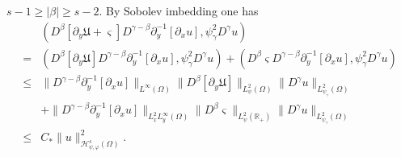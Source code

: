 \documentclass{amsart}
\numberwithin{equation}{section}
\begin{document}
 $s-1\geq|\beta|\geq s-2$.
By Sobolev imbedding one has
\begin{align*}
&(D^{\beta}[\partial_{y}\mathfrak{U}+\varsigma]D^{\gamma-\beta}\partial_{y}^{-1}[\partial_{x}u],\psi_{\gamma}^{2}D^{\gamma}u)\\
=& (D^{\beta}[\partial_{y}\mathfrak{U}]D^{\gamma-\beta}\partial_{y}^{-1}[\partial_{x}u],\psi_{\gamma}^{2}D^{\gamma}u)
  +(D^{\beta}\varsigma D^{\gamma-\beta}\partial_{y}^{-1}[\partial_{x}u],\psi_{\gamma}^{2}D^{\gamma}u)\\
\leq& \|D^{\gamma-\beta}\partial_{y}^{-1}[\partial_{x}u]\|_{L^{\infty}(\Omega)}
      \|D^{\beta}[\partial_{y}\mathfrak{U}]\|_{L_{\psi}^{2}(\Omega)}
      \|D^{\gamma}u\|_{L_{\psi_{\gamma}}^{2}(\Omega)}\\
    &+\|D^{\gamma-\beta}\partial_{y}^{-1}[\partial_{x}u]\|_{L_{x}^{2}L_{y}^{\infty}(\Omega)}
      \|D^{\beta}\varsigma\|_{L_{\psi}^{2}(\mathbb{R}_{+})}\|D^{\gamma}u\|_{L_{\psi_{\gamma}}^{2}(\Omega)}\\
\leq& C_{*}\|u\|_{\mathcal{H}_{\psi,\varphi}^{s}(\Omega)}^{2}.
\end{align*}
\end{document}
